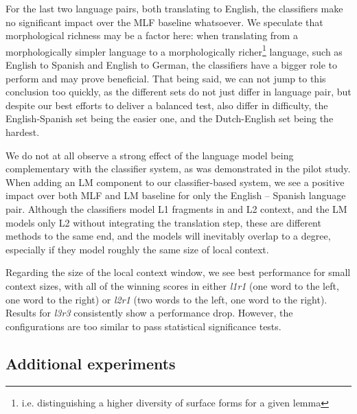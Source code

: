 For the last two language pairs, both translating to English, the classifiers
make no significant impact over the MLF baseline whatsoever. We speculate that
morphological richness may be a factor here: when translating from a
morphologically simpler language to a morphologically richer\footnote{i.e.
distinguishing a higher diversity of surface forms for a given lemma} language,
such as English to Spanish and English to German, the classifiers have a bigger
role to perform and may prove beneficial. That being said, we can not jump to
this conclusion too quickly, as the different sets do not just differ in
language pair, but despite our best efforts to deliver a balanced test, also
differ in difficulty, the English-Spanish set being the easier one, and the
Dutch-English set being the hardest.

We do not at all observe a strong effect of the language model being
complementary with the classifier system, as was demonstrated in the pilot
study. When adding an LM component to our classifier-based system, we see a
positive impact over both MLF and LM baseline for only the English -- Spanish
language pair.  Although the classifiers model L1 fragments in and L2 context,
and the LM models only L2 without integrating the translation step, these are
different methods to the same end, and the models will inevitably overlap to a
degree, especially if they model roughly the same size of local context.


Regarding the size of the local context window, we see best performance for
small context sizes, with all of the winning scores in either \emph{l1r1} (one word to
the left, one word to the right) or \emph{l2r1} (two words to the left, one word to
the right). Results for \emph{l3r3} consistently show a performance drop. However, the
configurations are too similar to pass statistical significance tests.

\subsection{Additional experiments}

